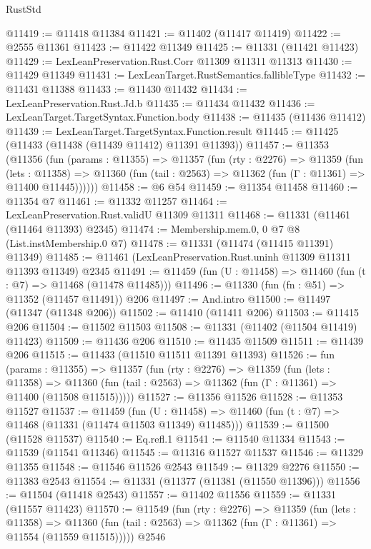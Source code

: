 \begin{lexlean}{RustStd}
\begin{coremodule}
@11419 := @11418 @11384
@11421 := @11402 (@11417 @11419)
@11422 := @2555 @11361
@11423 := @11422 @11349
@11425 := @11331 (@11421 @11423)
@11429 := LexLeanPreservation.Rust.Corr @11309 @11311 @11313
@11430 := @11429 @11349
@11431 := LexLeanTarget.RustSemantics.fallibleType
@11432 := @11431 @11388
@11433 := @11430 @11432
@11434 := LexLeanPreservation.Rust.Jd.b
@11435 := @11434 @11432
@11436 := LexLeanTarget.TargetSyntax.Function.body
@11438 := @11435 (@11436 @11412)
@11439 := LexLeanTarget.TargetSyntax.Function.result
@11445 := @11425 (@11433 (@11438 (@11439 @11412) @11391 @11393))
@11457 := @11353
    (@11356
      (fun (params : @11355) =>
      @11357
        (fun (rty : @2276) =>
        @11359
          (fun (lets : @11358) =>
          @11360 (fun (tail : @2563) => @11362 (fun (Γ : @11361) => @11400 @11445))))))
@11458 := @6 @54
@11459 := @11354 @11458
@11460 := @11354 @7
@11461 := @11332 @11257
@11464 := LexLeanPreservation.Rust.validU @11309 @11311
@11468 := @11331 (@11461 (@11464 @11393) @2345)
@11474 := Membership.mem.{0, 0} @7 @8 (List.instMembership.{0} @7)
@11478 := @11331 (@11474 (@11415 @11391) @11349)
@11485 := @11461 (LexLeanPreservation.Rust.uninh @11309 @11311 @11393 @11349) @2345
@11491 := @11459 (fun (U : @11458) => @11460 (fun (t : @7) => @11468 (@11478 @11485)))
@11496 := @11330 (fun (fn : @51) => @11352 (@11457 @11491)) @206
@11497 := And.intro
@11500 := @11497 (@11347 (@11348 @206))
@11502 := @11410 (@11411 @206)
@11503 := @11415 @206
@11504 := @11502 @11503
@11508 := @11331 (@11402 (@11504 @11419) @11423)
@11509 := @11436 @206
@11510 := @11435 @11509
@11511 := @11439 @206
@11515 := @11433 (@11510 @11511 @11391 @11393)
@11526 := fun (params : @11355) =>
  @11357
    (fun (rty : @2276) =>
    @11359
      (fun (lets : @11358) =>
      @11360 (fun (tail : @2563) => @11362 (fun (Γ : @11361) => @11400 (@11508 @11515)))))
@11527 := @11356 @11526
@11528 := @11353 @11527
@11537 := @11459
    (fun (U : @11458) => @11460 (fun (t : @7) => @11468 (@11331 (@11474 @11503 @11349) @11485)))
@11539 := @11500 (@11528 @11537)
@11540 := Eq.refl.{1}
@11541 := @11540 @11334
@11543 := @11539 (@11541 @11346)
@11545 := @11316 @11527 @11537
@11546 := @11329 @11355
@11548 := @11546 @11526 @2543
@11549 := @11329 @2276
@11550 := @11383 @2543
@11554 := @11331 (@11377 (@11381 (@11550 @11396)))
@11556 := @11504 (@11418 @2543)
@11557 := @11402 @11556
@11559 := @11331 (@11557 @11423)
@11570 := @11549
    (fun (rty : @2276) =>
    @11359
      (fun (lets : @11358) =>
      @11360 (fun (tail : @2563) => @11362 (fun (Γ : @11361) => @11554 (@11559 @11515)))))
    @2546

\end{coremodule}
\end{lexlean}
